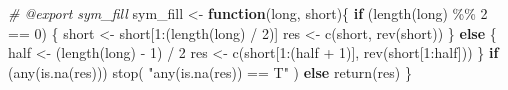\documentclass[
]{article}
\newenvironment{Shaded}{\begin{snugshade}}{\end{snugshade}}
\newcommand{\CommentTok}[1]{\textcolor[rgb]{0.56,0.35,0.01}{\textit{#1}}}
\newcommand{\ControlFlowTok}[1]{\textcolor[rgb]{0.13,0.29,0.53}{\textbf{#1}}}
\newcommand{\DecValTok}[1]{\textcolor[rgb]{0.00,0.00,0.81}{#1}}
\newcommand{\FunctionTok}[1]{\textcolor[rgb]{0.00,0.00,0.00}{#1}}
\newcommand{\NormalTok}[1]{#1}
\newcommand{\OtherTok}[1]{\textcolor[rgb]{0.56,0.35,0.01}{#1}}
\newcommand{\SpecialCharTok}[1]{\textcolor[rgb]{0.00,0.00,0.00}{#1}}
\newcommand{\StringTok}[1]{\textcolor[rgb]{0.31,0.60,0.02}{#1}}
\begin{document}
\begin{Shaded}
\begin{Highlighting}[]
\CommentTok{\#\textquotesingle{} @export sym\_fill}
\NormalTok{sym\_fill }\OtherTok{\textless{}{-}} \ControlFlowTok{function}\NormalTok{(long, short)\{}
  \ControlFlowTok{if}\NormalTok{ (}\FunctionTok{length}\NormalTok{(long) }\SpecialCharTok{\%\%} \DecValTok{2} \SpecialCharTok{==} \DecValTok{0}\NormalTok{) \{}
\NormalTok{    short }\OtherTok{\textless{}{-}}\NormalTok{ short[}\DecValTok{1}\SpecialCharTok{:}\NormalTok{(}\FunctionTok{length}\NormalTok{(long) }\SpecialCharTok{/} \DecValTok{2}\NormalTok{)]}
\NormalTok{    res }\OtherTok{\textless{}{-}} \FunctionTok{c}\NormalTok{(short, }\FunctionTok{rev}\NormalTok{(short))}
\NormalTok{  \} }\ControlFlowTok{else}\NormalTok{ \{}
\NormalTok{    half }\OtherTok{\textless{}{-}}\NormalTok{ (}\FunctionTok{length}\NormalTok{(long) }\SpecialCharTok{{-}} \DecValTok{1}\NormalTok{) }\SpecialCharTok{/} \DecValTok{2}
\NormalTok{    res }\OtherTok{\textless{}{-}} \FunctionTok{c}\NormalTok{(short[}\DecValTok{1}\SpecialCharTok{:}\NormalTok{(half }\SpecialCharTok{+} \DecValTok{1}\NormalTok{)], }\FunctionTok{rev}\NormalTok{(short[}\DecValTok{1}\SpecialCharTok{:}\NormalTok{half]))}
\NormalTok{  \}}
  \ControlFlowTok{if}\NormalTok{ (}\FunctionTok{any}\NormalTok{(}\FunctionTok{is.na}\NormalTok{(res)))}
    \FunctionTok{stop}\NormalTok{( }\StringTok{"any(is.na(res)) == T"}\NormalTok{ )}
  \ControlFlowTok{else}
    \FunctionTok{return}\NormalTok{(res)}
\NormalTok{\}}
\end{Highlighting}
\end{Shaded}
\end{document}
